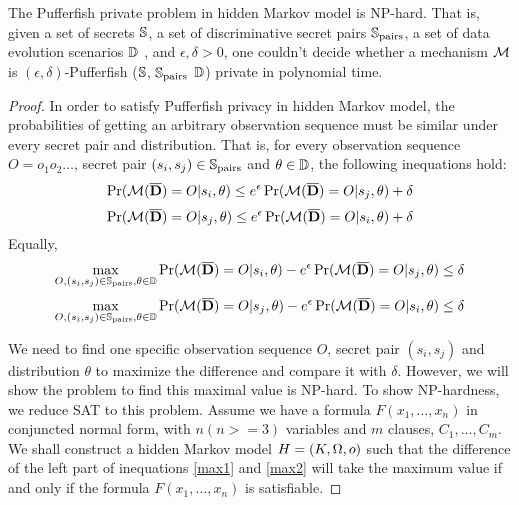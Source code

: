 \begin{theorem}
  The Pufferfish private problem in hidden Markov model is NP-hard.
  That is, given a set of secrets $\mathbb{S}$,
  a set of discriminative secret pairs $\mathbb{S}_{\textmd{pairs}}$, a set of data evolution
  scenarios $\mathbb{D}$ , and $\epsilon, \delta > 0$, one couldn't decide whether a mechanism $\mathcal{M}$ is
  $(\epsilon, \delta)$-Pufferfish ($\mathbb{S}$, $\mathbb{S}_{\textmd{pairs}}$
    $\mathbb{D}$) private in polynomial time.
\end{theorem}

\begin{proof}
  In order to satisfy Pufferfish privacy in hidden Markov model, the probabilities of getting
  an arbitrary observation sequence must be similar under every secret pair and distribution.
  That is, for every observation sequence $O=o_1o_2\ldots$, secret pair $(s_i, s_j) \in
    \mathbb{S}_{\textmd{pairs}}$ and $\theta \in \mathbb{D}$, the following inequations hold:
  \[
    \Pr (\mathcal{M} (\overline{\mathbf{D}}) = O| s_i, \theta) \leq  e^\epsilon \Pr (\mathcal{M} (\overline{\mathbf{D}}) = O| s_j, \theta) + \delta
  \]
  \[
    \Pr (\mathcal{M} (\overline{\mathbf{D}}) = O| s_j, \theta) \leq  e^\epsilon \Pr (\mathcal{M} (\overline{\mathbf{D}}) = O| s_i, \theta) + \delta
  \]
  Equally,
  \begin{equation}\label{max1}
     \max_{O,(s_i, s_j) \in
    \mathbb{S}_{\textmd{pairs}},\theta \in \mathbb{D}}
    { \Pr (\mathcal{M} (\overline{\mathbf{D}}) = O| s_i, \theta) - e^\epsilon \Pr (\mathcal{M} (\overline{\mathbf{D}}) = O| s_j, \theta) }\leq   \delta
  \end{equation}
  \begin{equation}\label{max2}
     \max_{O,(s_i, s_j) \in
    \mathbb{S}_{\textmd{pairs}},\theta \in \mathbb{D}}
     { \Pr (\mathcal{M} (\overline{\mathbf{D}}) = O| s_j, \theta) - e^\epsilon \Pr (\mathcal{M} (\overline{\mathbf{D}}) = O| s_i, \theta) }\leq   \delta
  \end{equation}

  We need to find one specific observation sequence $O$, secret pair $(s_i, s_j)$ and distribution $\theta$
  to maximize the difference and compare it with $\delta$.
  However, we will show the problem to find this maximal value is NP-hard.
  To show NP-hardness, we reduce SAT to this problem. Assume we have a formula $F(x_1,\ldots,x_n)$ in conjuncted normal form,
  with $n(n>=3)$ variables and $m$ clauses, $C_1,\ldots,C_m$. We shall construct a hidden Markov model $H = (K, \Omega, o)$
  such that the difference of the left part of inequations \ref{max1} and \ref{max2}
  will take the maximum value
   if and only if the formula $F(x_1,\ldots,x_n)$ is satisfiable.


\end{proof}

